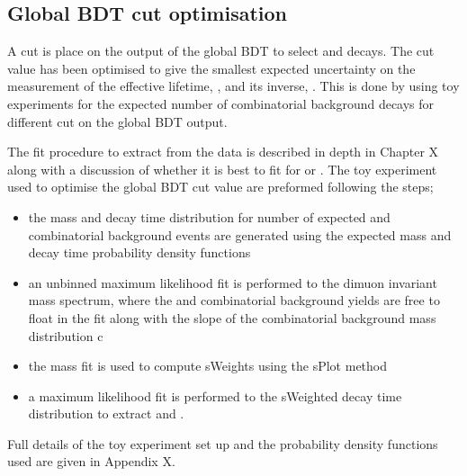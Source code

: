 \subsection{Global BDT cut optimisation}
\label{sec:globalBDToptimisation}

A cut is place on the output of the global BDT to select \bsmumu and \bhh decays. The cut value has been optimised to give the smallest expected uncertainty on the measurement of the \bsmumu effective lifetime, \tmumu, and its inverse, \invtmumu. This is done by using toy experiments for the expected number of \bsmumu combinatorial background decays for different cut on the global BDT output. 

The fit procedure to extract \tmumu from the data is described in depth in Chapter X along with a discussion of whether it is best to fit for \tmumu or \invtmumu. The toy experiment used to optimise the global BDT cut value are preformed following the steps;
\begin{itemize}
\item the mass and decay time distribution for number of expected \bsmumu and combinatorial background events are generated using the expected mass and decay time probability density functions
\item an unbinned maximum likelihood fit is performed to the dimuon invariant mass spectrum, where the \bsmumu and combinatorial background yields are free to float in the fit along with the slope of the combinatorial background mass distribution c
\item the mass fit is used to compute sWeights using the sPlot method \cite{Pivk:2004ty}
\item a maximum likelihood fit is performed to the sWeighted decay time distribution to extract \tmumu and \invtmumu. 
\end{itemize}
Full details of the toy experiment set up and the probability density functions used are given in Appendix X. 

